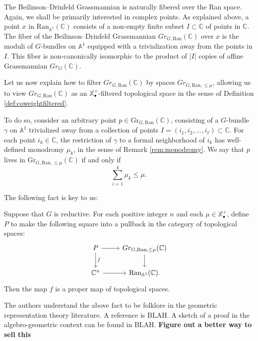 The Beilinson--Drinfeld Grassmannian is naturally fibered over the Ran space.  Again, we shall be primarily interested in complex points.  As explained above, a point $x$ in $\text{Ran}_{\mathbb{A}^1}(\mathbb{C})$ consists of a non-empty finite subset $I \subset \mathbb{C}$ of points in $\mathbb{C}$.  The fiber of the Beilinson--Drinfeld Grassmannian $Gr_{G,\text{Ran}}(\mathbb{C})$ over $x$ is the moduli of $G$-bundles on $\mathbb{A}^1$ equipped with a trivialization away from the points in $I$.  This fiber is non-canonically isomorphic to the product of $|I|$ copies of affine Grassmannian $Gr_G(\mathbb{C})$.

Let us now explain how to filter $Gr_{G,\text{Ran}}(\mathbb{C})$ by spaces $Gr_{G,\text{Ran},\le \mu}$, allowing us to view $Gr_{G,\text{Ran}}(\mathbb{C})$ as an $\mathbb{X}_{\bullet}^+$-filtered topological space in the sense of Definition \ref{def:coweightfiltered}.  

To do so, consider an arbitrary point $p \in \text{Gr}_{G,\text{Ran}}(\mathbb{C})$, consisting of a $G$-bundle $\gamma$ on $\mathbb{A}^1$ trivialized away from a collection of points $I=(i_1,i_2,...,i_\ell) \subset \mathbb{C}$.  For each point $i_k \in \mathbb{C}$, the restriction of $\gamma$ to a formal neighborhood of $i_k$ has well-defined monodromy $\mu_k$, in the sense of Remark \ref{rem:monodromy}.  We say that $p$ lives in $\text{Gr}_{G,\text{Ran},\le \mu}(\mathbb{C})$ if and only if
$$\sum_{i=1}^{k} \mu_k \le \mu.$$

The following fact is key to us:

\begin{lem} Suppose that $G$ is reductive.  For each positive integer $n$ and each $\mu \in \mathbb{X}_{\bullet}^+$, define $P$ to make the following square into a pullback in the category of topological spaces:
$$
\begin{tikzcd}
P \arrow{r} \arrow{d}{f} & Gr_{G,\text{Ran},\le \mu}(\mathbb{C}) \arrow{d} \\
\mathbb{C}^n \arrow{r} & \text{Ran}_{\mathbb{A}^1}(\mathbb{C}).
\end{tikzcd}
$$
Then the map $f$ is a proper map of topological spaces.
\end{lem}

The authors understand the above fact to be folklore in the geometric representation theory literature.  A reference is BLAH.  A sketch of a proof in the algebro-geometric context can be found in BLAH.  \textbf{Figure out a better way to sell this}
